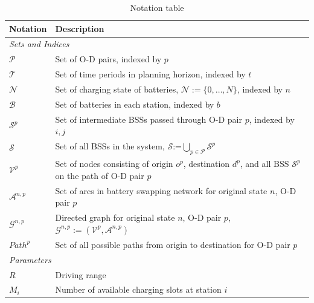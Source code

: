 \documentclass[12pt,hyperref,a4paper,UTF8]{ctexart}
\begin{document}
\begin{table}[!htbp]
  \centering
  \caption{Notation table}
  \label{tab:notation}
  \small
  \begin{tabular}{@{}lp{12cm}@{}}
    \toprule
    \textbf{Notation} & \textbf{Description} \\
    \midrule
    \multicolumn{2}{l}{\textit{Sets and Indices}} \\
    $\mathcal{P}$ & Set of O-D pairs, indexed by $p$\\
    $\mathcal{T}$ & Set of time periods in planning horizon, indexed by $t$ \\
    $\mathcal{N}$ & Set of charging state of batteries, $\mathcal{N}:=\{0,\dots,N\}$, indexed by $n$\\
    $\mathcal{B}$ & Set of batteries in each station, indexed by $b$ \\
    $\mathcal{S}^p$ & Set of intermediate BSSs passed through O-D pair $p$, indexed by $i, j$ \\
    $\mathcal{S}$ & Set of all BSSs in the system, $\mathcal{S}$:=$\bigcup_{p \in \mathcal{P}}\mathcal{S}^p$\\
    $\mathcal{V}^p$ & Set of nodes consisting of origin $o^p$, destination $d^p$, and all BSS $\mathcal{S}^p$ on the path of O-D pair $p$ \\  
    $\mathcal{A}^{n,p}$ & Set of arcs in battery swapping network for original state $n$, O-D pair $p$ \\
    $\mathcal{G}^{n,p}$ & Directed graph for original state $n$, O-D pair $p$, $\mathcal{G}^{n,p}:=(\mathcal{V}^p,\mathcal{A}^{n,p})$ \\
    $Path^p$ & Set of all possible paths from origin to destination for O-D pair $p$ \\
    \midrule
    \multicolumn{2}{l}{\textit{Parameters}} \\
    $R$ & Driving range \\
    $M_i$ & Number of available charging slots at station $i$ \\

\end{tabular}
\end{table}
\end{document}
